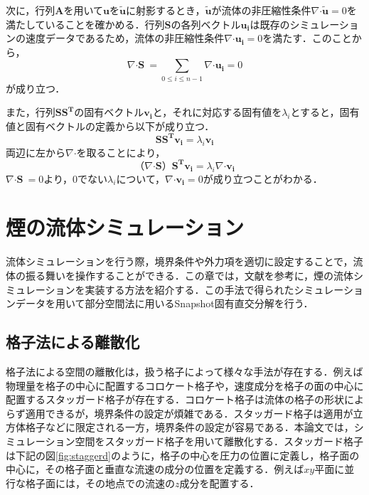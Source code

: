\documentclass[a4j,12pt]{jreport}
\begin{document}
次に，行列$\mathbf{A}$を用いて$\bm{u}$を$\bm{\tilde{u}}$に射影するとき，$\bm{\tilde{u}}$が流体の非圧縮性条件$\nabla\boldsymbol{\cdot}\bm{\tilde{u}} = 0$を満たしていることを確かめる．行列$\mathbf{S}$の各列ベクトル$\bm{u_i}$は既存のシミュレーションの速度データであるため，流体の非圧縮性条件$\nabla\boldsymbol{\cdot}\bm{u_i} = 0$を満たす．このことから，
\[
	\nabla\boldsymbol{\cdot}\mathbf{S}\ = \sum_{0 \le i \le n-1}\nabla\boldsymbol{\cdot}\bm{u_i} = 0
\]
が成り立つ．

また，行列$\mathbf{S}\mathbf{S^T}$の固有ベクトル$\bm{v_i}$と，それに対応する固有値を$\lambda_i$とすると，固有値と固有ベクトルの定義から以下が成り立つ．
\[
	\mathbf{S}\mathbf{S^T}\bm{v_i} = \lambda_i\bm{v_i}
\]
両辺に左から$\nabla\boldsymbol{\cdot}$を取ることにより，
\[
	（\nabla\boldsymbol{\cdot}\mathbf{S}）\mathbf{S^T}\bm{v_i} = \lambda_i\nabla\boldsymbol{\cdot}\bm{v_i}
\]
$\nabla\boldsymbol{\cdot}\mathbf{S}\ = 0$より，0でない$ \lambda_i$について，$\nabla\boldsymbol{\cdot}\bm{v_i} = 0$が成り立つことがわかる．
\chapter{煙の流体シミュレーション}
流体シミュレーションを行う際，境界条件や外力項を適切に設定することで，流体の振る舞いを操作することができる．この章では，文献\cite{fedkiw}を参考に，煙の流体シミュレーションを実装する方法を紹介する．この手法で得られたシミュレーションデータを用いて部分空間法に用いるSnapshot固有直交分解を行う．

\section{格子法による離散化}
格子法による空間の離散化は，扱う格子によって様々な手法が存在する．例えば物理量を格子の中心に配置するコロケート格子や，速度成分を格子の面の中心に配置するスタッガード格子が存在する．コロケート格子は流体の格子の形状によらず適用できるが，境界条件の設定が煩雑である．スタッガード格子は適用が立方体格子などに限定される一方，境界条件の設定が容易である．本論文では，シミュレーション空間をスタッガード格子を用いて離散化する．スタッガード格子は下記の図\ref{fig:staggerd}のように，格子の中心を圧力の位置に定義し，格子面の中心に，その格子面と垂直な流速の成分の位置を定義する．例えば$xy$平面に並行な格子面には，その地点での流速の$z$成分を配置する．
\end{document}
